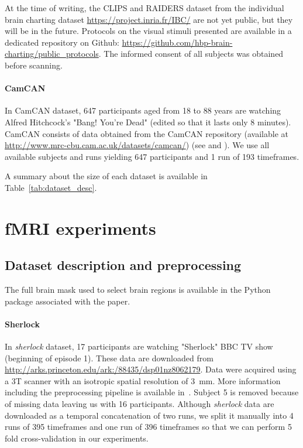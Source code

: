 At the time of writing, the CLIPS and RAIDERS dataset from the individual brain charting dataset \url{https://project.inria.fr/IBC/} are not yet public, but they will be in the future. Protocols on the visual stimuli presented are available in a dedicated repository on Github: \url{https://github.com/hbp-brain-charting/public_protocols}. The informed consent of all subjects was obtained before scanning.

\paragraph{CamCAN}
In CamCAN dataset, 647 participants aged from 18 to 88 years are watching Alfred Hitchcock's "Bang! You're Dead" (edited so that it lasts only 8 minutes).
%
CamCAN consists of data obtained from the CamCAN repository (available at \url{http://www.mrc-cbu.cam.ac.uk/datasets/camcan/}) (see \cite{taylor2017cambridge} and \cite{shafto2014cambridge}).
%
We use all available subjects and runs yielding 647 participants and 1 run of 193 timeframes.

A summary about the size of each dataset is available in Table~\ref{tab:dataset_desc}.


\section{fMRI experiments}
\label{sec:app_expts}
\subsection{Dataset description and preprocessing}
\label{preprocessing}
The full brain mask used to select brain regions is available in the Python package associated with the paper.

\paragraph{Sherlock}
In \emph{sherlock} dataset, 17 participants are watching "Sherlock" BBC TV show (beginning of episode 1). 
%
These data are downloaded from \url{http://arks.princeton.edu/ark:/88435/dsp01nz8062179}. 
%
Data were acquired using a 3T scanner with an isotropic spatial resolution of 3 mm. 
%
More information including the preprocessing pipeline is available in~\cite{chen2017shared}.
%
Subject 5 is removed because of missing data leaving us with 16 participants.
%
Although \emph{sherlock} data are downloaded as a temporal concatenation of two runs, we split it manually into 4 runs of 395 timeframes and one run of 396 timeframes so that we can perform 5 fold cross-validation in our experiments.


